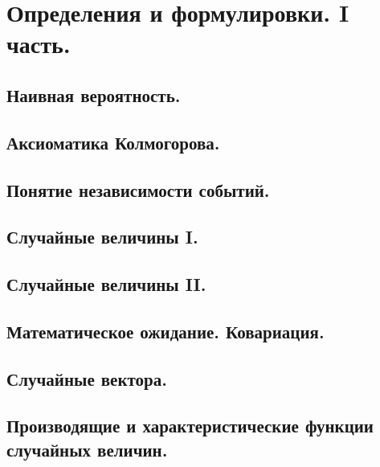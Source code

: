 \section{Определения и формулировки. I часть.}

\subsection{Наивная вероятность.}

\subsection{Аксиоматика Колмогорова.}

\subsection{Понятие независимости событий.}

\subsection{Случайные величины I.}

\subsection{Случайные величины II.}

\subsection{Математическое ожидание. Ковариация.}

\subsection{Случайные вектора.}

\subsection{Производящие и характеристические функции случайных величин.}


